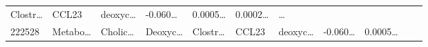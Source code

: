 \documentclass[
]{article}
\begin{document}
\begin{longtable}[]{@{}lllllllllll@{}}
\begin{minipage}[t]{0.07\columnwidth}
Clostr\ldots{}\strut
\end{minipage} & \begin{minipage}[t]{0.07\columnwidth}\raggedright
CCL23\strut
\end{minipage} & \begin{minipage}[t]{0.09\columnwidth}\raggedright
deoxyc\ldots{}\strut
\end{minipage} & \begin{minipage}[t]{0.07\columnwidth}\raggedright
-0.060\ldots{}\strut
\end{minipage} & \begin{minipage}[t]{0.07\columnwidth}\raggedright
0.0005\ldots{}\strut
\end{minipage} & \begin{minipage}[t]{0.07\columnwidth}\raggedright
0.0002\ldots{}\strut
\end{minipage} & \begin{minipage}[t]{0.03\columnwidth}\raggedright
\ldots{}\strut
\end{minipage}\tabularnewline
\begin{minipage}[t]{0.05\columnwidth}\raggedright
222528\strut
\end{minipage} & \begin{minipage}[t]{0.07\columnwidth}\raggedright
Metabo\ldots{}\strut
\end{minipage} & \begin{minipage}[t]{0.07\columnwidth}\raggedright
Cholic\ldots{}\strut
\end{minipage} & \begin{minipage}[t]{0.09\columnwidth}\raggedright
Deoxyc\ldots{}\strut
\end{minipage} & \begin{minipage}[t]{0.07\columnwidth}\raggedright
Clostr\ldots{}\strut
\end{minipage} & \begin{minipage}[t]{0.07\columnwidth}\raggedright
CCL23\strut
\end{minipage} & \begin{minipage}[t]{0.09\columnwidth}\raggedright
deoxyc\ldots{}\strut
\end{minipage} & \begin{minipage}[t]{0.07\columnwidth}\raggedright
-0.060\ldots{}\strut
\end{minipage} & \begin{minipage}[t]{0.07\columnwidth}\raggedright
0.0005\ldots{}\strut
\end{minipage} & \begin{minipage}[t]{0.07\columnwidth}\raggedright

\end{minipage}
\end{longtable}
\end{document}

